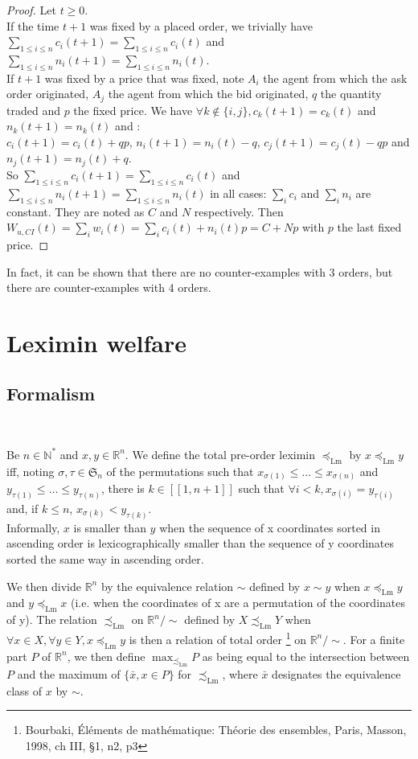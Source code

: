 \documentclass[a4paper]{article}
\newcommand{\N}{\mathbb{N}}
\newcommand{\R}{\mathbb{R}}
\newcommand{\Sg}{\mathfrak{S}}
\newcommand{\Lm}{\preceq_\mathrm{Lm}} %
\newcommand{\Lms}{\precsim_\mathrm{Lm}}
\newtheorem[style=S, bodystyle=\noindent]{thm}{Theorem}[section]
\newtheorem[style=S, bodystyle=\noindent]{defn}[thm]{Definition}
\newtheorem[style=S, bodystyle=\noindent]{propo}[thm]{Proposition}
\newtheorem[style=S, bodystyle=\noindent]{prop}[thm]{Property}
\newtheorem[style=S, bodystyle=\noindent]{coro}[thm]{Corollary}
\newtheorem[style=S, bodystyle=\noindent]{lem}[thm]{Lemma}
\newtheorem[style=S, headstyle=\bfseries\boldmath Theorem, bodystyle=\noindent]{thm*}{Theorem}
\newtheorem[style=S, headstyle=\bfseries\boldmath Definition, bodystyle=\noindent]{defn*}{Definition}
\newtheorem[style=S, headstyle=\bfseries\boldmath Proposition, bodystyle=\noindent]{propo*}{Proposition}
\newtheorem[style=S, headstyle=\bfseries\boldmath Property, bodystyle=\noindent]{prop*}{Property}
\newtheorem[style=S, headstyle=\bfseries\boldmath Corollary, bodystyle=\noindent]{coro*}{Corollary}
\newtheorem[style=S, headstyle=\bfseries\boldmath Lemma, bodystyle=\noindent]{lem*}{Lemma}
\begin{document}
\begin{proof}
	Let $t \geq 0$.\\
	If the time $t+1$ was fixed by a placed order, we trivially have $\sum_{1\leq i\leq n}c_i(t+1) = \sum_{1\leq i\leq n}c_i(t)$ and $\sum_{1\leq i\leq n}n_i(t+1) = \sum_{1\leq i\leq n}n_i(t)$. \\
	If $t+1$ was fixed by a price that was fixed, note $A_i$ the agent from which the ask order originated, $A_j$ the agent from which the bid originated, $q$ the quantity traded and $p$ the fixed price. We have $\forall k \not\in \{i,j\}, c_k(t+1) = c_k(t)$ and $n_k(t+1) = n_k(t)$ and : \\
	$c_i(t+1) = c_i(t) + qp$, $n_i(t+1) = n_i(t) - q$, $c_j(t+1) = c_j(t) - qp$ and $n_j(t+1) = n_j(t) + q$. \\
	So $\sum_{1\leq i\leq n}c_i(t+1) = \sum_{1\leq i\leq n}c_i(t)$ and $\sum_{1\leq i\leq n}n_i(t+1) = \sum_{1\leq i\leq n}n_i(t)$ in all cases: $\sum_ic_i$ and $\sum_in_i$ are constant. They are noted as $C$ and $N$ respectively.
	Then $W_{u,CI}(t) = \sum_iw_i(t) = \sum_i c_i(t) + n_i(t)p = C + Np$ with $p$ the last fixed price.
\end{proof}

In fact, it can be shown that there are no counter-examples with 3 orders, but there are counter-examples with 4 orders.
\section{Leximin welfare}

\subsection{Formalism}
~
\begin{defn}
    Be $n\in\N^*$ and $x,y \in \R^n$. We define the total pre-order leximin $\Lm$ by $x \Lm y$ iff, noting $\sigma, \tau \in \Sg_n$ of the permutations such that $x_{\sigma(1)} \leq \ldots \leq x_{\sigma(n)}$ and $y_{\tau(1)} \leq \ldots \leq y_{\tau(n)}$, there is $k \in [\![1,n+1]\!]$ such that $\forall i < k, x_{\sigma(i)} = y_{\tau(i)}$ and, if $k \leq n$, $x_{\sigma(k)} < y_{\tau(k)}$. \\
	Informally, $x$ is smaller than $y$ when the sequence of x coordinates sorted in ascending order is lexicographically smaller than the sequence of y coordinates sorted the same way in ascending order.
\end{defn}

\par
We then divide $\R^n$ by the equivalence relation $\sim$ defined by $x\sim y$ when $x \Lm y$ and $y \Lm x$ (i.e. when the coordinates of x are a permutation of the coordinates of y). The relation $\Lms$ on $\R^n/\sim$ defined by $X\Lms Y$ when $\forall x \in X,\forall y \in Y, x\Lm y$ is then a relation of total order \footnote{Bourbaki, \'Eléments de mathématique: Théorie des ensembles, Paris, Masson, 1998, ch III, \S 1, n2, p3} on $\R^n/\sim$. For a finite part $P$ of $\R^n$, we then define $\max_{\Lms}P$ as being equal to the intersection between $P$ and the maximum of $\{\bar x, x \in P\}$ for $\Lms$, where $\bar x$ designates the equivalence class of $x$ by $\sim$.
\end{document}

